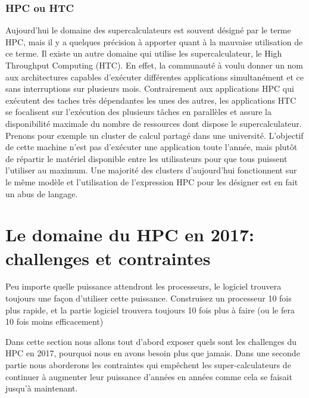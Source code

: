\subsubsection{HPC ou HTC}
Aujourd'hui le domaine des supercalculateurs est souvent désigné par le terme HPC, mais il y a quelques précision à apporter quant à la mauvaise utilisation de ce terme. Il existe un autre domaine qui utilise les supercalculateur, le High Throughput Computing (HTC). En effet, la communauté à voulu donner un nom aux architectures capables d'exécuter différentes applications simultanément et ce sans interruptions sur plusieurs mois. Contrairement aux applications HPC qui exécutent des taches très dépendantes les unes des autres, les applications HTC se focalisent sur l'exécution des plusieurs tâches en parallèles et assure la disponibilité maximale du nombre de ressources dont dispose le supercalculateur. Prenons pour exemple un cluster de calcul partagé dans une université. L'objectif de cette machine n'est pas d'exécuter une application toute l'année, mais plutôt de répartir le matériel disponible entre les utilisateurs pour que tous puissent l'utiliser au maximum. Une majorité des clusters d'aujourd'hui fonctionnent sur le même modèle et l'utilisation de l'expression HPC pour les désigner est en fait un abus de langage.






\section{Le domaine du HPC en 2017: challenges et contraintes}


\begin{fancyquotes}
Peu importe quelle puissance attendront les processeurs, le logiciel trouvera toujours une façon d'utiliser cette puissance. Construisez un processeur 10 fois plus rapide, et la partie logiciel trouvera toujours 10 fois plus à faire (ou le fera 10 fois moins efficacement)  \cite{sutter2005software}
\end{fancyquotes}


Dans cette section nous allons tout d'abord exposer quels sont les challenges du HPC en 2017, pourquoi nous en avons besoin plus que jamais. Dans une seconde partie nous aborderons les contraintes qui empêchent les super-calculateurs de continuer à augmenter leur puissance d'années en années comme cela se faisait jusqu'à maintenant.

